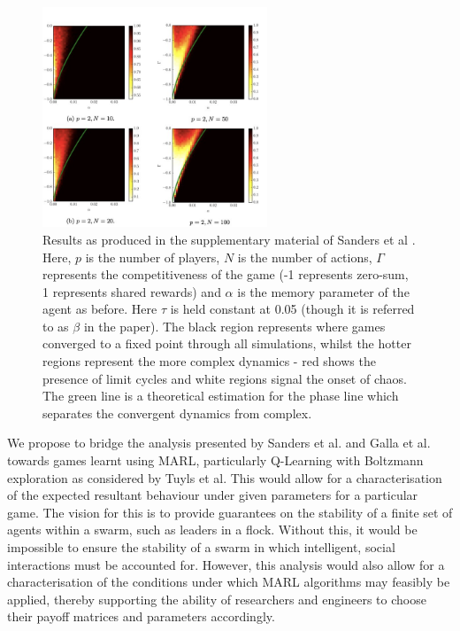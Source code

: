 \documentclass[.../main.tex]{subfiles}
\begin{document}
    \begin{figure}[h]
    	\centering
    	\includegraphics[width=0.6\textwidth]{Figures/GallaPredictions}
    	\caption{ \label{fig::GallaPredictions} Results as produced in the supplementary material
    	of Sanders et al \cite{Sanders2018}. Here, $p$ is the number of players, $N$ is the number
    	of actions, $\Gamma$ represents the competitiveness of the game (-1 represents zero-sum, 1
    	represents shared rewards) and $\alpha$ is the memory parameter of the agent as before.
    	Here $\tau$ is held constant at 0.05 (though it is referred to as $\beta$ in the paper).
    	The black region represents where games converged to a fixed point through all simulations,
    	whilst the hotter regions represent the more complex dynamics - red shows the presence of
    	limit cycles and white regions signal the onset of chaos. The green line is a theoretical
    	estimation for the phase line which separates the convergent dynamics from complex.}
    \end{figure}

    We propose to bridge the analysis presented by Sanders
    et al. and Galla et al. towards games learnt using MARL, particularly Q-Learning with
    Boltzmann exploration as considered by Tuyls et al. This would allow for a characterisation of
    the expected resultant behaviour under given parameters for a particular game. The vision for
    this is to provide guarantees on the stability of a finite set of agents within a swarm, such as
    leaders in a flock. Without this, it would be impossible to ensure the stability of a swarm in
    which intelligent, social interactions must be accounted for. However, this analysis
    would also allow for a characterisation of the conditions under which MARL algorithms may
    feasibly be applied, thereby supporting the ability of researchers and engineers to choose their
    payoff matrices and parameters accordingly.
\end{document}
